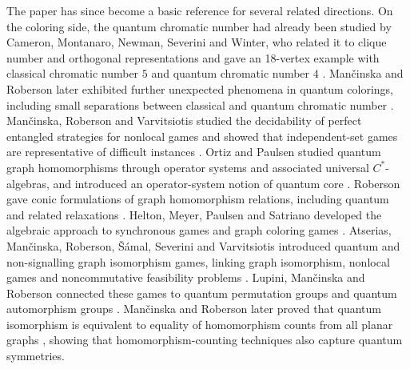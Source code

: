 \documentclass[11pt]{amsart}
\theoremstyle{plain}
\theoremstyle{definition}
\begin{document}
The paper \cite{MRQuantumHom} has since become a basic reference for several related directions.  On the coloring side, the quantum chromatic number had already been studied by Cameron, Montanaro, Newman, Severini and Winter, who related it to clique number and orthogonal representations and gave an 18-vertex example with classical chromatic number $5$ and quantum chromatic number $4$ \cite{CameronMontanaroNewmanSeveriniWinter}.  Man\v{c}inska and Roberson later exhibited further unexpected phenomena in quantum colorings, including small separations between classical and quantum chromatic number \cite{MancinskaRobersonOddities}.  Man\v{c}inska, Roberson and Varvitsiotis studied the decidability of perfect entangled strategies for nonlocal games and showed that independent-set games are representative of difficult instances \cite{MancinskaRobersonVarvitsiotis}.  Ortiz and Paulsen studied quantum graph homomorphisms through operator systems and associated universal $C^*$-algebras, and introduced an operator-system notion of quantum core \cite{OrtizPaulsen}.  Roberson gave conic formulations of graph homomorphism relations, including quantum and related relaxations \cite{RobersonConic}.  Helton, Meyer, Paulsen and Satriano developed the algebraic approach to synchronous games and graph coloring games \cite{HeltonMeyerPaulsenSatriano}.  Atserias, Man\v{c}inska, Roberson, \v{S}\'amal, Severini and Varvitsiotis introduced quantum and non-signalling graph isomorphism games, linking graph isomorphism, nonlocal games and noncommutative feasibility problems \cite{AtseriasEtAl}.  Lupini, Man\v{c}inska and Roberson connected these games to quantum permutation groups and quantum automorphism groups \cite{LupiniMancinskaRoberson}.  Man\v{c}inska and Roberson later proved that quantum isomorphism is equivalent to equality of homomorphism counts from all planar graphs \cite{MancinskaRobersonPlanar}, showing that homomorphism-counting techniques also capture quantum symmetries.
\end{document}
